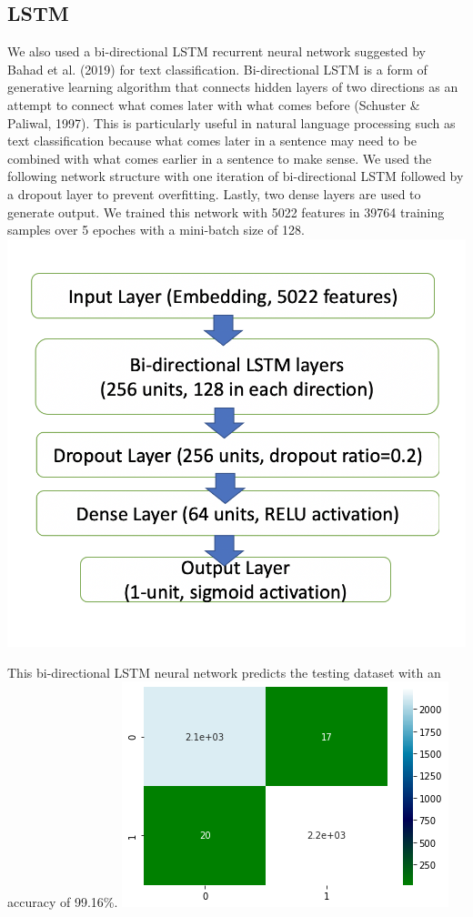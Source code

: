 \documentclass{article}
\begin{document}
\begin{multicols}{2}
\subsection{LSTM}
We also used a bi-directional LSTM recurrent neural network suggested by Bahad et al. (2019) for text classification. Bi-directional LSTM is a form of generative learning algorithm that connects hidden layers of two directions as an attempt to connect what comes later with what comes before (Schuster \& Paliwal, 1997). This is particularly useful in natural language processing such as text classification because what comes later in a sentence may need to be combined with what comes earlier in a sentence to make sense.
We used the following network structure with one iteration of bi-directional LSTM followed by a dropout layer to prevent overfitting. Lastly, two dense layers are used to generate output. We trained this network with 5022 features in 39764 training samples over 5 epoches with a mini-batch size of 128.
\includegraphics[scale=0.4]{images/img5.png}

This bi-directional LSTM neural network predicts the testing dataset with an accuracy of 99.16\%.
\includegraphics[scale=0.6]{images/lstmcm.png}



\end{multicols}
\end{document}
